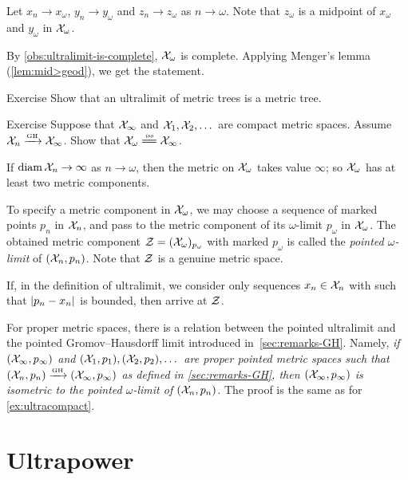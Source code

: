 Let $x_n\to x_\omega$, $y_n\to y_\omega$ and $z_n\to z_\omega$ as $n\to \omega$.
Note that $z_\omega$ is a midpoint of $x_\omega$ and $y_\omega$ in $\mathcal{X}_\omega$.

By \ref{obs:ultralimit-is-complete}, $\mathcal{X}_\omega$ is complete.
Applying Menger's lemma (\ref{lem:mid>geod}), we get the statement.
\qeds


\begin{thm}{Exercise}\label{ex:lim(tree)}
Show that an ultralimit of metric trees is a metric tree. 
\end{thm}

\begin{thm}{Exercise}\label{ex:ultracompact}
Suppose that $\mathcal{X}_\infty$ and $\mathcal{X}_1,\mathcal{X}_2,\dots$ are compact metric spaces.
Assume $\mathcal{X}_n\xrightarrow{\mbox{\tiny\rm GH}}\mathcal{X}_\infty$.
Show that $\spc{X}_\omega\iso\spc{X}_\infty$.
\end{thm}

If $\operatorname{\rm diam}\nolimits \mathcal{X}_n\to \infty$ as $n\to\omega$,
then the metric on $\mathcal{X}_\omega$ takes value $\infty$;
so $\mathcal{X}_\omega$ has at least two metric components.

To specify a metric component in $\mathcal{X}_\omega$,
we may choose a sequence of marked points $p_n$ in $\mathcal{X}_n$, and pass to the metric component of its $\omega$-limit $p_\omega$ in $\mathcal{X}_\omega$.
The obtained metric component $\mathcal{Z}=(\mathcal{X}_\omega)_{p_\omega}$ with marked $p_\omega$ is called the \emph{pointed $\omega$-limit} of $(\mathcal{X}_n,p_n)$.
Note that $\mathcal{Z}$ is a genuine metric space.

If, in the definition of ultralimit, we consider only sequences $x_n\z\in \spc{X}_n$ with such that $\dist{p_n}{x_n}{}$ is bounded, 
then arrive at $\mathcal{Z}$.  

For proper metric spaces, there is a relation between the pointed ultralimit and the pointed Gromov--Hausdorff limit introduced in~\ref{sec:remarks-GH}.
Namely, \textit{if $(\mathcal{X}_\infty,p_\infty)$ and $(\mathcal{X}_1,p_1),(\mathcal{X}_2,p_2),\dots$ are proper pointed metric spaces such that $(\mathcal{X}_n,p_n)\xrightarrow{\mbox{\tiny\rm GH}}(\mathcal{X}_\infty,p_\infty)$ as defined in \ref{sec:remarks-GH}, then $(\mathcal{X}_\infty,p_\infty)$ is isometric to the pointed $\omega$-limit of $(\mathcal{X}_n,p_n)$.}
The proof is the same as for \ref{ex:ultracompact}.





\section{Ultrapower}

